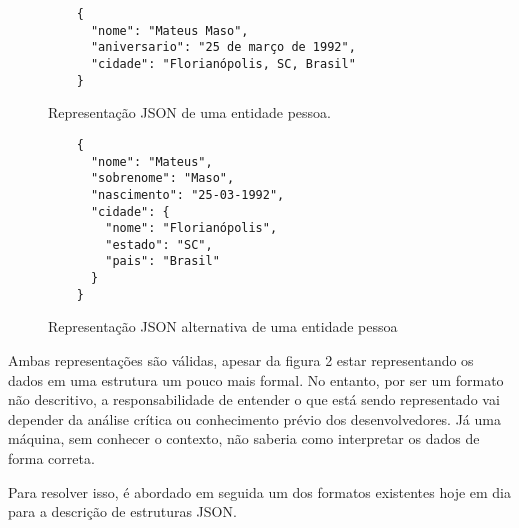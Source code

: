 \begin{figure}[H]
  \centering
  \begin{verbatim}
    {
      "nome": "Mateus Maso",
      "aniversario": "25 de março de 1992",
      "cidade": "Florianópolis, SC, Brasil"
    }
  \end{verbatim}
  \caption{Representação JSON de uma entidade pessoa.}
\end{figure}

\begin{figure}[H]
  \centering
  \begin{verbatim}
    {
      "nome": "Mateus",
      "sobrenome": "Maso",
      "nascimento": "25-03-1992",
      "cidade": {
        "nome": "Florianópolis",
        "estado": "SC",
        "pais": "Brasil"
      }
    }
  \end{verbatim}
  \caption{Representação JSON alternativa de uma entidade pessoa}
\end{figure}

Ambas representações são válidas, apesar da figura 2 estar representando os dados em uma estrutura um pouco mais formal. No entanto, por ser um formato não descritivo, a responsabilidade de entender o que está sendo representado vai depender da análise crítica ou conhecimento prévio dos desenvolvedores. Já uma máquina, sem conhecer o contexto, não saberia como interpretar os dados de forma correta. \cite{Droettboom2015}

Para resolver isso, é abordado em seguida um dos formatos existentes hoje em dia para a descrição de estruturas JSON.
